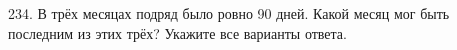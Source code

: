 234. В трёх месяцах подряд было ровно 90 дней. Какой месяц мог быть последним из этих трёх? Укажите все варианты ответа.\\

